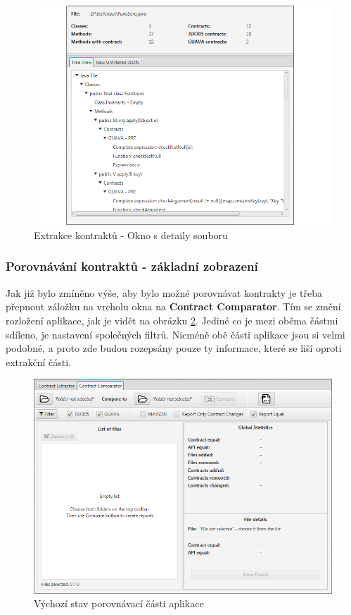 			\begin{figure}[!htb]
					\centering
					\includegraphics[width=1\textwidth]{img/guide05.png}
					\caption[guide05]{Extrakce kontraktů - Okno s detaily souboru}
					\label{guide05}
				\endminipage\hfill
			\end{figure}
			
	
	\subsubsection{Porovnávání kontraktů - základní zobrazení}
		Jak již bylo zmíněno výše, aby bylo možné porovnávat kontrakty je třeba přepnout záložku na vrcholu okna na \textbf{Contract Comparator}. Tím se změní rozložení aplikace, jak je vidět na obrázku \ref{guide06}. Jediné co je mezi oběma částmi sdíleno, je nastavení společných filtrů. Nicméně obě části aplikace jsou si velmi podobné, a proto zde budou rozepsány pouze ty informace, které se liší oproti extrakční části.
		
			\begin{figure}[!htb]
					\centering
					\includegraphics[width=1\textwidth]{img/guide06.png}
					\caption[guide06]{Výchozí stav porovnávací části aplikace}
					\label{guide06}
				\endminipage\hfill
			\end{figure}
		
